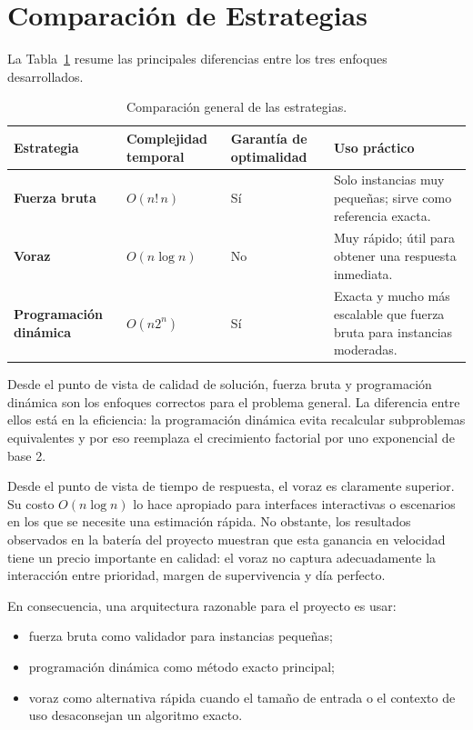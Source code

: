 \documentclass[12pt,a4paper]{article}
\begin{document}
\section{Comparaci\'on de Estrategias}

La Tabla~\ref{tab:comparacion-estrategias} resume las principales diferencias entre los tres enfoques desarrollados.

\begin{table}[ht]
  \centering
  \begin{tabularx}{\textwidth}{>{\bfseries}l>{\centering\arraybackslash}X>{\centering\arraybackslash}X>{\centering\arraybackslash}X}
    \toprule
    Estrategia & Complejidad temporal & Garant\'ia de optimalidad & Uso pr\'actico \\
    \midrule
    Fuerza bruta & \(O(n!\,n)\) & S\'i & Solo instancias muy peque\~nas; sirve como referencia exacta. \\
    Voraz & \(O(n \log n)\) & No & Muy r\'apido; \'util para obtener una respuesta inmediata. \\
    Programaci\'on din\'amica & \(O(n2^n)\) & S\'i & Exacta y mucho m\'as escalable que fuerza bruta para instancias moderadas. \\
    \bottomrule
  \end{tabularx}
  \caption{Comparaci\'on general de las estrategias.}
  \label{tab:comparacion-estrategias}
\end{table}

Desde el punto de vista de calidad de soluci\'on, fuerza bruta y programaci\'on din\'amica son los enfoques correctos para el problema general. La diferencia entre ellos est\'a en la eficiencia: la programaci\'on din\'amica evita recalcular subproblemas equivalentes y por eso reemplaza el crecimiento factorial por uno exponencial de base 2.

Desde el punto de vista de tiempo de respuesta, el voraz es claramente superior. Su costo \(O(n\log n)\) lo hace apropiado para interfaces interactivas o escenarios en los que se necesite una estimaci\'on r\'apida. No obstante, los resultados observados en la bater\'ia del proyecto muestran que esta ganancia en velocidad tiene un precio importante en calidad: el voraz no captura adecuadamente la interacci\'on entre prioridad, margen de supervivencia y d\'ia perfecto.

En consecuencia, una arquitectura razonable para el proyecto es usar:

\begin{itemize}
  \item fuerza bruta como validador para instancias peque\~nas;
  \item programaci\'on din\'amica como m\'etodo exacto principal;
  \item voraz como alternativa r\'apida cuando el tama\~no de entrada o el contexto de uso desaconsejan un algoritmo exacto.
\end{itemize}
\end{document}
